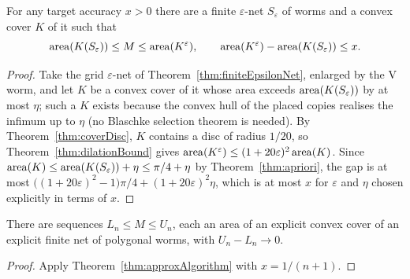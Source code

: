 \begin{theorem}
    \label{thm:approxAlgorithm}
    \leanok
    For any target accuracy $x > 0$ there are a finite $\varepsilon$-net
    $S_\varepsilon$ of worms and a convex cover $K$ of it such that
    \[
        \operatorname{area}(K(S_\varepsilon)) \le M \le \operatorname{area}(K^{\varepsilon}),
        \qquad
        \operatorname{area}(K^{\varepsilon}) - \operatorname{area}(K(S_\varepsilon)) \le x .
    \]
\end{theorem}
\begin{proof}
    \leanok
    Take the grid $\varepsilon$-net of Theorem~\ref{thm:finiteEpsilonNet},
    enlarged by the V worm, and let $K$ be a convex cover of it whose area
    exceeds $\operatorname{area}(K(S_\varepsilon))$ by at most $\eta$; such a $K$ exists
    because the convex hull of the placed copies realises the infimum up to
    $\eta$ (no Blaschke selection theorem is needed). By
    Theorem~\ref{thm:coverDisc}, $K$ contains a disc of radius $1/20$, so
    Theorem~\ref{thm:dilationBound} gives
    $\operatorname{area}(K^{\varepsilon}) \le (1 + 20\varepsilon)^2 \operatorname{area}(K)$. Since
    $\operatorname{area}(K) \le \operatorname{area}(K(S_\varepsilon)) + \eta \le \pi/4 + \eta$ by
    Theorem~\ref{thm:apriori}, the gap is at most
    $\big((1+20\varepsilon)^2 - 1\big)\pi/4 + (1+20\varepsilon)^2 \eta$, which is
    at most $x$ for $\varepsilon$ and $\eta$ chosen explicitly in terms of $x$.
\end{proof}

\begin{corollary}
    \label{cor:convergentBounds}
    \leanok
    There are sequences $L_n \le M \le U_n$, each an area of an explicit convex
    cover of an explicit finite net of polygonal worms, with
    $U_n - L_n \to 0$.
\end{corollary}
\begin{proof}
    \leanok
    Apply Theorem~\ref{thm:approxAlgorithm} with $x = 1/(n+1)$.
\end{proof}

